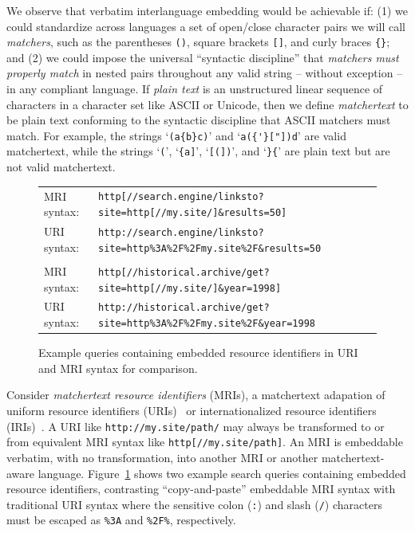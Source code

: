 We observe that verbatim interlanguage embedding would be achievable if:
(1)
we could standardize across languages
a set of open/close character pairs
we will call \emph{matchers},
such as the parentheses \verb|()|,
square brackets \verb|[]|,
and curly braces \verb|{}|;
and
(2) 
we could impose the universal ``syntactic discipline''
that \emph{matchers must properly match} in nested pairs
throughout any valid string -- without exception --
in any compliant language.
If \emph{plain text} is an unstructured linear sequence of characters
in a character set like ASCII or Unicode,
then we define \emph{matchertext} to be plain text
conforming to the syntactic discipline
that ASCII matchers must match.
For example, the strings `\verb|(a{b}c)|' and `\verb|a({'}["])d|'
are valid matchertext,
while the strings
`\verb|(|', `\verb|{a]|', `\verb|[(])|', and `\verb|}{|'
are plain text but are not valid matchertext.

\begin{figure}[t]
\begin{center}
\begin{small}
\begin{tabular}{ll}
MRI syntax:	& \verb|http[//search.engine/linksto?site=http[//my.site/]&results=50]| \\
URI syntax:	& \verb|http://search.engine/linksto?site=http%3A%2F%2Fmy.site%2F&results=50| \\
\\
MRI syntax:	& \verb|http[//historical.archive/get?site=http[//my.site/]&year=1998]| \\
URI syntax:	& \verb|http://historical.archive/get?site=http%3A%2F%2Fmy.site%2F&year=1998| \\
\end{tabular}
\end{small}
\end{center}
\label{fig:search-query}
\caption{Example queries containing embedded resource identifiers
	in URI and MRI syntax for comparison.}
\end{figure}

Consider \emph{matchertext resource identifiers} (MRIs),
a matchertext adapation of
uniform resource identifiers (URIs)~\cite{rfc3986} or
internationalized resource identifiers (IRIs)~\cite{rfc3987}.
A URI like \verb|http://my.site/path/|
may always be transformed to or from
equivalent MRI syntax like \verb|http[//my.site/path]|.
An MRI is embeddable verbatim, with no transformation,
into another MRI or another matchertext-aware language.
Figure~\ref{fig:search-query} shows two example search queries
containing embedded resource identifiers,
contrasting ``copy-and-paste'' embeddable MRI syntax
with traditional URI syntax where the sensitive
colon (\verb|:|) and slash (\verb|/|) characters
must be escaped as \verb|%3A| and \verb|%2F%|, respectively.

